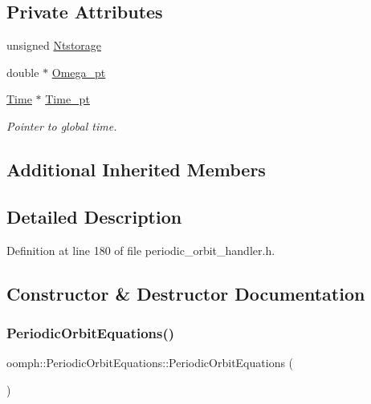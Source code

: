 \subsection*{Private Attributes}
\begin{DoxyCompactItemize}
\item 
unsigned \hyperlink{classoomph_1_1PeriodicOrbitEquations_a15f995392ba77c8c664c22df656efb60}{Ntstorage}
\item 
double $\ast$ \hyperlink{classoomph_1_1PeriodicOrbitEquations_a045a3ed37f016aeb55348c0703eacdbc}{Omega\+\_\+pt}
\item 
\hyperlink{classoomph_1_1Time}{Time} $\ast$ \hyperlink{classoomph_1_1PeriodicOrbitEquations_a015c732c43b83babe169d1ea3342fd66}{Time\+\_\+pt}
\begin{DoxyCompactList}\small\item\em Pointer to global time. \end{DoxyCompactList}\end{DoxyCompactItemize}
\subsection*{Additional Inherited Members}


\subsection{Detailed Description}


Definition at line 180 of file periodic\+\_\+orbit\+\_\+handler.\+h.



\subsection{Constructor \& Destructor Documentation}
\mbox{\label{classoomph_1_1PeriodicOrbitEquations_a75cb0bc88ecc1c76756f2da7910a2c06}} 
\subsubsection{\texorpdfstring{Periodic\+Orbit\+Equations()}{PeriodicOrbitEquations()}\hspace{0.1cm}{\footnotesize\ttfamily [1/2]}}
{\footnotesize\ttfamily oomph\+::\+Periodic\+Orbit\+Equations\+::\+Periodic\+Orbit\+Equations (\begin{DoxyParamCaption}{ }\end{DoxyParamCaption})\hspace{0.3cm}{\ttfamily [inline]}}



